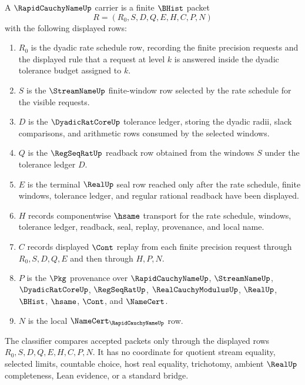 \begin{definition}
\label{def:rapid-cauchy-name-carrier}
A $\RapidCauchyNameUp$ carrier is a finite $\BHist$ packet
$$
R=(R_0,S,D,Q,E,H,C,P,N)
$$
with the following displayed rows:
\begin{enumerate}
\item $R_0$ is the dyadic rate schedule row, recording the finite precision requests and the displayed rule that a request at level $k$ is answered inside the dyadic tolerance budget assigned to $k$.
\item $S$ is the $\StreamNameUp$ finite-window row selected by the rate schedule for the visible requests.
\item $D$ is the $\DyadicRatCoreUp$ tolerance ledger, storing the dyadic radii, slack comparisons, and arithmetic rows consumed by the selected windows.
\item $Q$ is the $\RegSeqRatUp$ readback row obtained from the windows $S$ under the tolerance ledger $D$.
\item $E$ is the terminal $\RealUp$ seal row reached only after the rate schedule, finite windows, tolerance ledger, and regular rational readback have been displayed.
\item $H$ records componentwise $\hsame$ transport for the rate schedule, windows, tolerance ledger, readback, seal, replay, provenance, and local name.
\item $C$ records displayed $\Cont$ replay from each finite precision request through $R_0,S,D,Q,E$ and then through $H,P,N$.
\item $P$ is the $\Pkg$ provenance over $\RapidCauchyNameUp$, $\StreamNameUp$, $\DyadicRatCoreUp$, $\RegSeqRatUp$, $\RealCauchyModulusUp$, $\RealUp$, $\BHist$, $\hsame$, $\Cont$, and $\NameCert$.
\item $N$ is the local $\NameCert_{\RapidCauchyNameUp}$ row.
\end{enumerate}
The classifier compares accepted packets only through the displayed rows $R_0,S,D,Q,E,H,C,P,N$. It has no coordinate for quotient stream equality, selected limits, countable choice, host real equality, trichotomy, ambient $\RealUp$ completeness, Lean evidence, or a standard bridge.
\end{definition}

